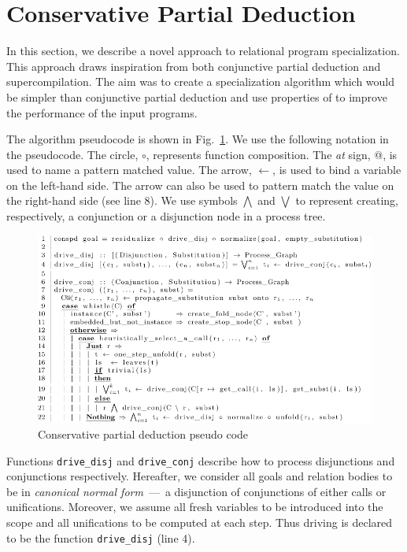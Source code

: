 \newcommand{\code}[1]{\texttt{#1}}

\section{Conservative Partial Deduction}
\label{conspd}

In this section, we describe a novel approach to relational program specialization.
This approach draws inspiration from both conjunctive partial deduction and supercompilation.
The aim was to create a specialization algorithm which would be simpler than conjunctive partial deduction and use properties of \mk to improve the performance of the input programs.

The algorithm pseudocode is shown in Fig.~\ref{fig:ncpd-pseudo}.
We use the following notation in the pseudocode.
The circle, $\circ$, represents function composition.
The \emph{at} sign, @, is used to name a pattern matched value.
The arrow, $\leftarrow$, is used to bind a variable on the left-hand side.
The arrow can also be used to pattern match the value on the right-hand side (see line 8).
We use symbols $\bigwedge$ and $\bigvee$ to represent creating, respectively, a conjunction or a disjunction node in a process tree.


\begin{figure}[!t]
  \centering
  \includegraphics[width=\textwidth]{figures/algo-pseudo-crop.pdf}
  \caption{Conservative partial deduction pseudo code}
  \label{fig:ncpd-pseudo}
\end{figure}

Functions \code{drive\_disj} and \code{drive\_conj} describe how to process disjunctions and conjunctions respectively.
Hereafter, we consider all goals and relation bodies to be in \emph{canonical normal form}~---~a disjunction of conjunctions of either calls or unifications.
Moreover, we assume all fresh variables to be introduced into the scope and all unifications to be computed at each step.
Thus driving is declared to be the function \code{drive\_disj} (line 4).


